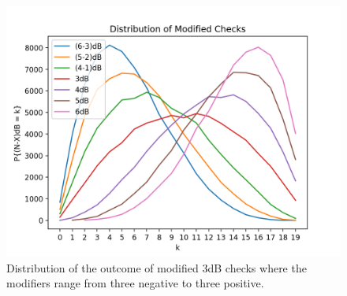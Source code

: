 \documentclass{scrartcl}
\begin{document}
\begin{figure}[ht]
\centering
\includegraphics[scale=0.9]{modified_distributions.png}
\caption{Distribution of the outcome of modified $3$dB checks where the modifiers range from three negative to three positive.}
\end{figure}
\end{document}
